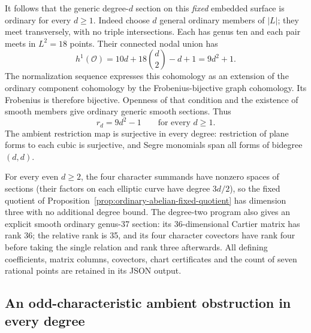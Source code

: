 \begin{example}
It follows that the generic degree-$d$ section on this
\emph{fixed} embedded surface is ordinary for every $d\geq1$.
Indeed choose $d$ general ordinary members of $|L|$;
they meet transversely, with no triple intersections.
Each has genus ten and each pair meets in $L^2=18$ points.
Their connected nodal union has
\[
 h^1(\mathcal O)=10d+18\binom d2-d+1=9d^2+1.
\]
The normalization sequence expresses this cohomology
as an extension of the ordinary component cohomology
by the Frobenius-bijective graph cohomology.  Its
Frobenius is therefore bijective.  Openness of that
condition and the existence of smooth members give
ordinary generic smooth sections.  Thus
\begin{equation}\label{eq:abelian-example-generic-rank}
 r_d=9d^2-1\qquad\text{for every }d\geq1.
\end{equation}
The ambient restriction map is surjective in every
degree: restriction of plane forms to each cubic is
surjective, and Segre monomials span all forms of
bidegree $(d,d)$.

For every even $d\geq2$, the four character summands
have nonzero spaces of sections (their factors on each
elliptic curve have degree $3d/2$), so the fixed quotient
of Proposition~\ref{prop:ordinary-abelian-fixed-quotient}
has dimension three with no additional degree bound.
The degree-two program also gives an explicit smooth
ordinary genus-37 section: its 36-dimensional Cartier
matrix has rank 36; the relative rank is 35, and its
four character covectors have rank four before taking
the single relation and rank three afterwards.
All defining coefficients, matrix columns, covectors,
chart certificates and the count of seven rational
points are retained in its JSON output.
\end{example}


\subsection{An odd-characteristic ambient obstruction in every degree}
\label{subsec:product-surface-obstruction}


